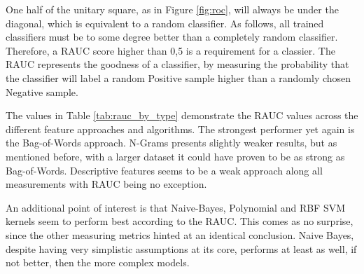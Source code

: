 		\par
		
		One half of the unitary square, as in Figure \ref{fig:roc}, will always be under the diagonal, which is equivalent to a random classifier. As follows, all trained classifiers must be to some degree better than a completely random classifier. Therefore, a RAUC score higher than 0,5 is a requirement for a classier. The RAUC represents the goodness of a classifier, by measuring the probability that the classifier will label a random Positive sample higher than a randomly chosen Negative sample. 
		
	
		\par
		
		The values in Table \ref{tab:rauc_by_type} demonstrate the RAUC values across the different feature approaches and algorithms. The strongest performer yet again is the Bag-of-Words approach. N-Grams presents slightly weaker results, but as mentioned before, with a larger dataset it could have proven to be as strong as Bag-of-Words. Descriptive features seems to be a weak approach along all measurements with RAUC being no exception.
		
		\par
		
		An additional point of interest is that Naive-Bayes, Polynomial and RBF SVM kernels seem to perform best according to the RAUC. This comes as no surprise, since the other measuring metrics hinted at an identical conclusion. Naive Bayes, despite having very simplistic assumptions at its core, performs at least as well, if not better, then the more complex models.
		
		

		
